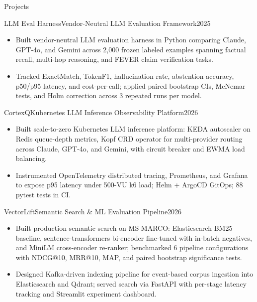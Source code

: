 \documentclass[]{mcdowellcv}
\begin{document}
\begin{cvsection}{Projects}
  \begin{cvsubsection}{LLM Eval Harness}{Vendor-Neutral LLM Evaluation Framework}{2025}
    \begin{itemize}
      \item Built vendor-neutral LLM evaluation harness in Python comparing Claude, GPT-4o, and Gemini across 2,000 frozen labeled examples spanning factual recall, multi-hop reasoning, and FEVER claim verification tasks.
      \item Tracked ExactMatch, TokenF1, hallucination rate, abstention accuracy, p50/p95 latency, and cost-per-call; applied paired bootstrap CIs, McNemar tests, and Holm correction across 3 repeated runs per model.
    \end{itemize}
    \vspace{-1.5pt}
  \end{cvsubsection}

  \begin{cvsubsection}{CortexQ}{Kubernetes LLM Inference Observability Platform}{2026}
    \begin{itemize}
      \item Built scale-to-zero Kubernetes LLM inference platform: KEDA autoscaler on Redis queue-depth metrics, Kopf CRD operator for multi-provider routing across Claude, GPT-4o, and Gemini, with circuit breaker and EWMA load balancing.
      \item Instrumented OpenTelemetry distributed tracing, Prometheus, and Grafana to expose p95 latency under 500-VU k6 load; Helm + ArgoCD GitOps; 88 pytest tests in CI.
    \end{itemize}
    \vspace{-1.5pt}
  \end{cvsubsection}

  \begin{cvsubsection}{VectorLift}{Semantic Search \& ML Evaluation Pipeline}{2026}
    \begin{itemize}
      \item Built production semantic search on MS MARCO: Elasticsearch BM25 baseline, sentence-transformers bi-encoder fine-tuned with in-batch negatives, and MiniLM cross-encoder re-ranker; benchmarked 6 pipeline configurations with NDCG@10, MRR@10, MAP, and paired bootstrap significance tests.
      \item Designed Kafka-driven indexing pipeline for event-based corpus ingestion into Elasticsearch and Qdrant; served search via FastAPI with per-stage latency tracking and Streamlit experiment dashboard.
    \end{itemize}
  \end{cvsubsection}
\end{cvsection}
\end{document}
